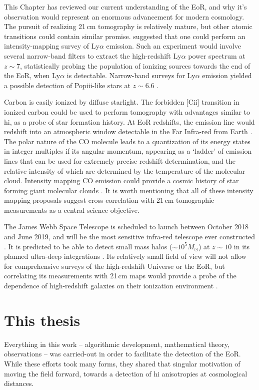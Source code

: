 This Chapter has reviewed our current understanding of the EoR, and why it's observation would represent an enormous advancement for modern cosmology. The pursuit of realizing 21\,cm tomography is relatively mature, but other atomic transitions could contain similar promise. \cite{Silva.13} suggested that one could perform an intensity-mapping survey of Ly$\alpha$ emission. Such an experiment would involve several narrow-band filters to extract the high-redshift Ly$\alpha$ power spectrum at $z\sim7$, statistically probing the population of ionizing sources towards the end of the EoR, when Ly$\alpha$ is detectable. Narrow-band surveys for Ly$\alpha$ emission yielded a possible detection of Pop{\sc iii}-like stars at $z\sim 6.6$ \citep{Sobral.15}.

Carbon is easily ionized by diffuse starlight. The forbidden [C{\sc ii}] transition in ionized carbon could be used to perform tomography with advantages similar to {\sc hi}, as a probe of star formation history. At EoR redshifts, the emission line would redshift into an atmospheric window detectable in the Far Infra-red from Earth \citep[e.g.][]{Gong.12, Hunacek.16, Pentericci.16}. 
The polar nature of the CO molecule leads to a quantization of its energy states in integer multiples if its angular momentum, appearing as a `ladder' of emission lines that can be used for extremely precise redshift determination, and the relative intensity of which are determined by the temperature of the molecular cloud. Intensity mapping CO emission could provide a cosmic history of star forming giant molecular clouds \citep[e.g.][]{Righi.08,Lidz.11.CO}.
It is worth mentioning that all of these intensity mapping proposals suggest cross-correlation with 21\,cm tomographic measurements as a central science objective.

The James Webb Space Telescope is scheduled to launch between October 2018 and June 2019, and will be the most sensitive infra-red telescope ever constructed \citep{jwst}. It is predicted to be able to detect small mass halos ($\sim 10^5 M_{\odot}$) at $z\sim 10$ in its planned ultra-deep integrations \citep{Salvaterra.11, Zackrisson.11}. Its relatively small field of view will not allow for comprehensive surveys of the high-redshift Universe or the EoR, but correlating its measurements with 21\,cm maps would provide a probe of the dependence of high-redshift galaxies on their ionization environment \citep[e.g.][]{Beardsley.15}.

\section{This thesis}
\label{sec:eor_intro_this_thesis}
Everything in this work -- algorithmic development, mathematical theory, observations -- was carried-out in order to facilitate the detection of the EoR. While these efforts took many forms, they shared that singular motivation of moving the field forward, towards a detection of {\sc hi} anisotropies at cosmological distances. 

